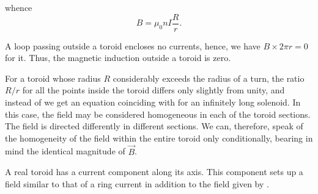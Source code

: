\noindent
whence
\begin{equation}\label{eq:6_110}
    B = \mu_0 n I \frac{R}{r}.
\end{equation}

A loop passing outside a toroid encloses no currents, hence, we have $B\times 2\pi r = 0$ for it. Thus, the magnetic induction outside a toroid is zero.

For a toroid whose radius $R$ considerably exceeds the radius of a turn, the ratio $R/r$ for all the points inside the toroid differs only slightly from unity, and instead of  we get an equation
coinciding with  for an infinitely long solenoid. In this case, the field may be considered homogeneous in each of the toroid sections. The field is directed differently in different sections. We can, therefore, speak of the homogeneity of the field within the entire toroid only conditionally, bearing in mind the identical magnitude of $\vec{B}$.

A real toroid has a current component along its axis. This component sets up a field similar to that of a ring current in addition to the field given by .
